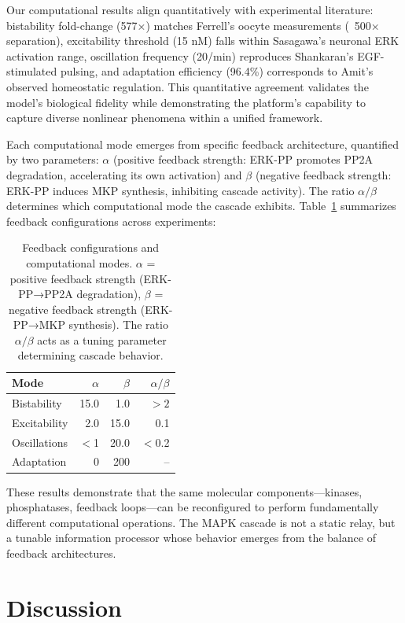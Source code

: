 \documentclass[twocolumn,11pt]{article}
\begin{document}
Our computational results align quantitatively with experimental literature: bistability fold-change (577×) matches Ferrell's oocyte measurements (~500× separation), excitability threshold (15 nM) falls within Sasagawa's neuronal ERK activation range, oscillation frequency (20/min) reproduces Shankaran's EGF-stimulated pulsing, and adaptation efficiency (96.4\%) corresponds to Amit's observed homeostatic regulation. This quantitative agreement validates the model's biological fidelity while demonstrating the platform's capability to capture diverse nonlinear phenomena within a unified framework.

Each computational mode emerges from specific feedback architecture, quantified by two parameters: $\alpha$ (positive feedback strength: ERK-PP promotes PP2A degradation, accelerating its own activation) and $\beta$ (negative feedback strength: ERK-PP induces MKP synthesis, inhibiting cascade activity). The ratio $\alpha/\beta$ determines which computational mode the cascade exhibits. Table~\ref{tab:feedback_summary} summarizes feedback configurations across experiments:

\begin{table}[h]
\centering
\small
\caption{Feedback configurations and computational modes. $\alpha$ = positive feedback strength (ERK-PP→PP2A degradation), $\beta$ = negative feedback strength (ERK-PP→MKP synthesis). The ratio $\alpha/\beta$ acts as a tuning parameter determining cascade behavior.}
\label{tab:feedback_summary}
\begin{tabular}{@{}lrrr@{}}
\toprule
\textbf{Mode} & \textbf{$\alpha$} & \textbf{$\beta$} & \textbf{$\alpha/\beta$} \\
\midrule
Bistability & 15.0 & 1.0 & $>2$ \\
Excitability & 2.0 & 15.0 & 0.1 \\
Oscillations & $<$1 & 20.0 & $<$0.2 \\
Adaptation & 0 & 200 & -- \\
\bottomrule
\end{tabular}
\end{table}

These results demonstrate that the same molecular components—kinases, phosphatases, feedback loops—can be reconfigured to perform fundamentally different computational operations. The MAPK cascade is not a static relay, but a tunable information processor whose behavior emerges from the balance of feedback architectures.

\section*{Discussion}
\end{document}
